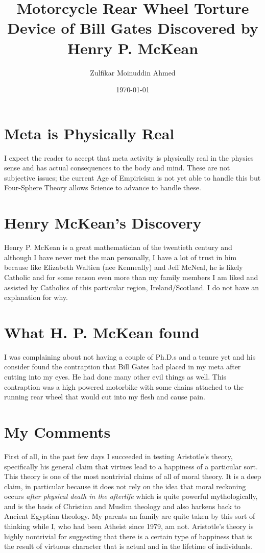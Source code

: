 \documentclass{amsart}
\title{Motorcycle Rear Wheel Torture Device of Bill Gates Discovered by Henry P. McKean}
\author{Zulfikar Moinuddin Ahmed}
\date{\today}
\begin{document}
\maketitle

\section{Meta is Physically Real}

I expect the reader to accept that meta activity is physically real in the physics sense and has actual consequences to the body and mind.  These are not subjective issues; the current Age of Empiricism is not yet able to handle this but Four-Sphere Theory allows Science to advance to handle these.

\section{Henry McKean's Discovery}

Henry P. McKean is a great mathematician of the twentieth century and although I have never met the man personally, I have a lot of trust in him because like Elizabeth Waltien (nee Kenneally) and Jeff McNeal, he is likely Catholic and for some reason even more than my family members I am liked and assisted by Catholics of this particular region, Ireland/Scotland.  I do not have an explanation for why.

\section{What H. P. McKean found}

I was complaining about not having a couple of Ph.D.s and a tenure yet and his consider found the contraption that Bill Gates had placed in my meta after cutting into my eyes.  He had done many other evil things as well.  This contraption was a high powered motorbike with some chains attached to the running rear wheel that would cut into my flesh and cause pain.

\section{My Comments}

First of all, in the past few days I succeeded in testing Aristotle's theory, specifically his general claim that virtues lead to a happiness of a particular sort.  This theory is one of the most nontrivial claims of all of moral theory.  It is a deep claim, in particular because it does not rely on the idea that moral reckoning occurs {\em after physical death in the afterlife} which is quite powerful mythologically, and is the basis of Christian and Muslim theology and also harkens back to Ancient Egyptian theology.  My parents an family are quite taken by this sort of thinking while I, who had been Atheist since 1979, am not.  Aristotle's theory is highly nontrivial for suggesting that there is a certain type of happiness that is the result of virtuous character that is actual and in the lifetime of individuals.  
\end{document}
